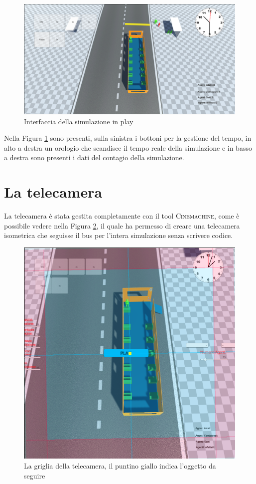 \documentclass[12pt, openany]{book}
\begin{document}
 	\begin{figure}[H]
 		\centering
 		\includegraphics[width=0.8\linewidth]{"Immagini/PlayGui.png"}
 		\caption{Interfaccia della simulazione in play}
 		\label{fig:InterfacciaPlay}
 	\end{figure}
 	Nella Figura \ref{fig:InterfacciaPlay} sono presenti, sulla sinistra i bottoni per la gestione del tempo, in alto a destra un orologio che scandisce il tempo reale della simulazione e in basso a destra sono presenti i dati del contagio della simulazione.
 	\section{La telecamera}
 	La telecamera è stata gestita completamente con il tool \textsc{Cinemachine}, come è possibile vedere nella Figura \ref{fig:Cinemachine}, il quale ha permesso di creare una telecamera isometrica che seguisse il bus per l'intera simulazione senza scrivere codice.
 	\begin{figure}[H]
 		\centering
 		\includegraphics[width=0.7\linewidth]{"Immagini/Cinemachine.png"}
 		\caption{La griglia della telecamera, il puntino giallo indica l'oggetto da seguire}
 		\label{fig:Cinemachine}
 	\end{figure}
\end{document}
